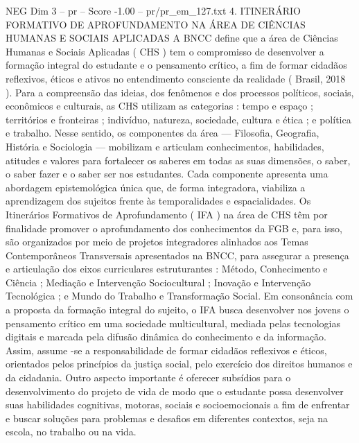 \begin{textsample}{NEG Dim 3 – pr – Score -1.00 – pr/pr\_em\_127.txt}  \label{ex:f3_neg_131}
4.
ITINERÁRIO FORMATIVO DE APROFUNDAMENTO NA ÁREA DE CIÊNCIAS HUMANAS E SOCIAIS APLICADAS A BNCC define que a área de Ciências Humanas e Sociais Aplicadas ( CHS ) tem o compromisso de desenvolver a formação integral do estudante e o pensamento crítico, a fim de formar cidadãos reflexivos, éticos e ativos no entendimento consciente da realidade ( Brasil, 2018 ).
Para a compreensão das ideias, dos fenômenos e dos processos políticos, sociais, econômicos e culturais, as CHS utilizam as categorias : tempo e espaço ; territórios e fronteiras ; indivíduo, natureza, sociedade, cultura e ética ; e política e trabalho.
Nesse sentido, os componentes da área — Filosofia, Geografia, História e Sociologia — mobilizam e articulam conhecimentos, habilidades, atitudes e valores para fortalecer os saberes em todas as suas dimensões, o saber, o saber fazer e o saber ser nos estudantes.
Cada componente apresenta uma abordagem epistemológica única que, de forma integradora, viabiliza a aprendizagem dos sujeitos frente às temporalidades e espacialidades.
Os Itinerários Formativos de Aprofundamento ( IFA ) na área de CHS têm por finalidade promover o aprofundamento dos conhecimentos da FGB e, para isso, são organizados por meio de projetos integradores alinhados aos Temas Contemporâneos Transversais apresentados na BNCC, para assegurar a presença e articulação dos eixos curriculares estruturantes : Método, Conhecimento e Ciência ; Mediação e Intervenção Sociocultural ; Inovação e Intervenção Tecnológica ; e Mundo do Trabalho e Transformação Social.
Em consonância com a proposta da formação integral do sujeito, o IFA busca desenvolver nos jovens o pensamento crítico em uma sociedade multicultural, mediada pelas tecnologias digitais e marcada pela difusão dinâmica do conhecimento e da informação.
Assim, assume -se a responsabilidade de formar cidadãos reflexivos e éticos, orientados pelos princípios da justiça social, pelo exercício dos direitos humanos e da cidadania.
Outro aspecto importante é oferecer subsídios para o desenvolvimento do projeto de vida de modo que o estudante possa desenvolver suas habilidades cognitivas, motoras, sociais e socioemocionais a fim de enfrentar e buscar soluções para problemas e desafios em diferentes contextos, seja na escola, no trabalho ou na vida.

\end{textsample}
